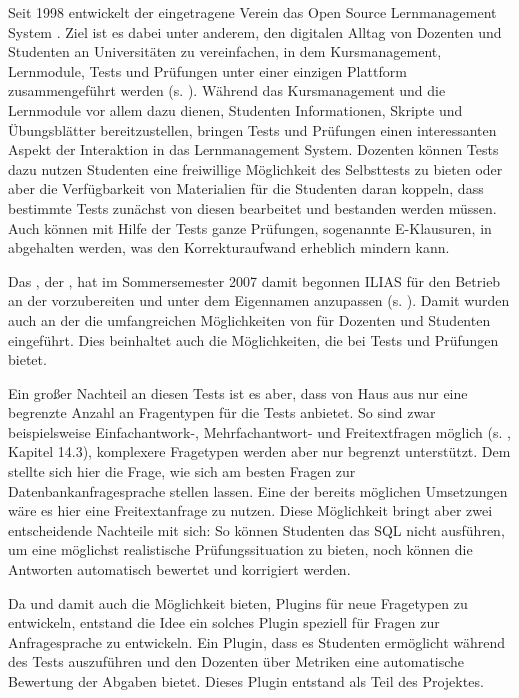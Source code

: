 Seit 1998 entwickelt der eingetragene Verein  das Open Source Lernmanagement System . Ziel ist es dabei unter anderem, den digitalen Alltag von Dozenten und Studenten an Universitäten zu vereinfachen, in dem Kursmanagement, Lernmodule, Tests und Prüfungen unter einer einzigen Plattform zusammengeführt werden (s. \cite{Ilias1998}). Während das Kursmanagement und die Lernmodule vor allem dazu dienen, Studenten Informationen, Skripte und Übungsblätter bereitzustellen, bringen Tests und Prüfungen einen interessanten Aspekt der Interaktion in das Lernmanagement System. Dozenten können Tests dazu nutzen Studenten eine freiwillige Möglichkeit des Selbsttests zu bieten oder aber die Verfügbarkeit von Materialien für die Studenten daran koppeln, dass bestimmte Tests zunächst von diesen bearbeitet und bestanden werden müssen. Auch können mit Hilfe der Tests ganze Prüfungen, sogenannte E-Klausuren, in  abgehalten werden, was den Korrekturaufwand erheblich mindern kann.

Das  , der  , hat im Sommersemester 2007 damit begonnen ILIAS für den Betrieb an der  vorzubereiten und unter dem Eigennamen  anzupassen (s. \cite{Studon2007}). Damit wurden auch an der  die umfangreichen Möglichkeiten von  für Dozenten und Studenten eingeführt. Dies beinhaltet auch die Möglichkeiten, die  bei Tests und Prüfungen bietet. 

Ein großer Nachteil an diesen Tests ist es aber, dass  von Haus aus nur eine begrenzte Anzahl an Fragentypen für die Tests anbietet. So sind zwar beispielsweise Einfachantwork-, Mehrfachantwort- und Freitextfragen möglich (s. \cite{IliasAutorenDokumentation}, Kapitel 14.3), komplexere Fragetypen werden aber nur begrenzt unterstützt. Dem  stellte sich hier die Frage, wie sich am besten Fragen zur Datenbankanfragesprache  stellen lassen. Eine der bereits möglichen Umsetzungen wäre es hier eine Freitextanfrage zu nutzen. Diese Möglichkeit bringt aber zwei entscheidende Nachteile mit sich: So können Studenten das SQL nicht ausführen, um eine möglichst realistische Prüfungssituation zu bieten, noch können die Antworten automatisch bewertet und korrigiert werden.

Da  und damit auch  die Möglichkeit bieten, Plugins für neue Fragetypen zu entwickeln, entstand die Idee ein solches Plugin speziell für Fragen zur Anfragesprache  zu entwickeln. Ein Plugin, dass es Studenten ermöglicht  während des Tests auszuführen und den Dozenten über Metriken eine automatische Bewertung der Abgaben bietet. Dieses Plugin entstand als Teil des  Projektes. 